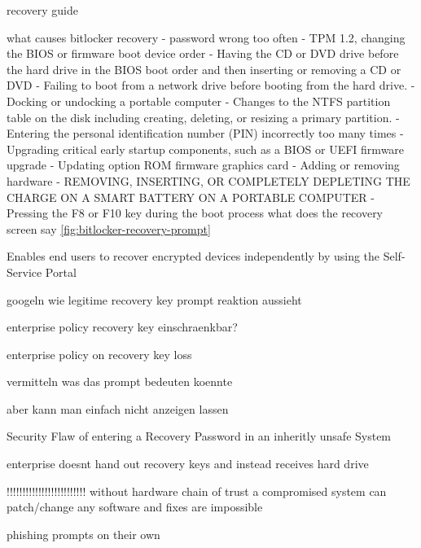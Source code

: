 recovery guide

what causes bitlocker recovery
- password wrong too often
- TPM 1.2, changing the BIOS or firmware boot device order
- Having the CD or DVD drive before the hard drive in the BIOS boot order and then inserting or removing a CD or DVD
- Failing to boot from a network drive before booting from the hard drive.
- Docking or undocking a portable computer
- Changes to the NTFS partition table on the disk including creating, deleting, or resizing a primary partition.
- Entering the personal identification number (PIN) incorrectly too many times
- Upgrading critical early startup components, such as a BIOS or UEFI firmware upgrade
- Updating option ROM firmware graphics card
- Adding or removing hardware
- REMOVING, INSERTING, OR COMPLETELY DEPLETING THE CHARGE ON A SMART BATTERY ON A PORTABLE COMPUTER
- Pressing the F8 or F10 key during the boot process
what does the recovery screen say \autoref{fig:bitlocker-recovery-prompt}

Enables end users to recover encrypted devices independently by using the Self-Service Portal

googeln wie legitime recovery key prompt reaktion aussieht

enterprise policy recovery key einschraenkbar?

enterprise policy on recovery key loss

vermitteln was das prompt bedeuten koennte

aber kann man einfach nicht anzeigen lassen

Security Flaw of entering a Recovery Password in an inheritly unsafe System

enterprise doesnt hand out recovery keys and instead receives hard drive


!!!!!!!!!!!!!!!!!!!!!!!!!
without hardware chain of trust a compromised system can patch/change any software and fixes are impossible

phishing prompts on their own